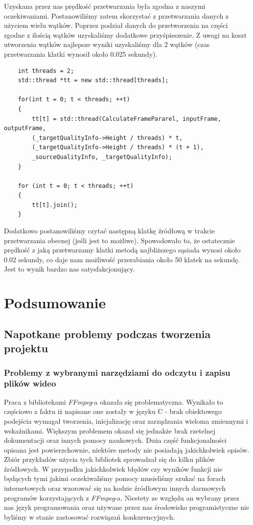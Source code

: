 \documentclass[twoside]{projektInzynierskiMS}
\begin{document}
Uzyskana przez nas prędkość przetwarzania była zgodna z naszymi oczekiwaniami. Postanowiliśmy zatem skorzystać z przetwarzania danych z użyciem wielu wątków. Poprzez podział danych do przetworzenia na części zgodne z ilością wątków uzyskaliśmy dodatkowe przyśpieszenie. Z uwagi na koszt utworzenia wątków najlepsze wyniki uzyskaliśmy dla 2 wątków (czas przetwarzania klatki wynosił około 0.025 sekundy). 

\begin{verbatim}
    int threads = 2;
    std::thread *tt = new std::thread[threads];

    for(int t = 0; t < threads; ++t)
    {
        tt[t] = std::thread(CalculateFramePararel, inputFrame, outputFrame,
        (_targetQualityInfo->Height / threads) * t, 
        (_targetQualityInfo->Height / threads) * (t + 1),
        _sourceQualityInfo, _targetQualityInfo);
    }

    for (int t = 0; t < threads; ++t)
    {
        tt[t].join();
    }
\end{verbatim}

Dodatkowo postanowiliśmy czytać następną klatkę źródłową w trakcie przetwarzania obecnej (jeśli jest to możliwe). Spowodowało to, że ostatecznie prędkość z jaką przetwarzamy klatki metodą najbliższego sąsiada wynosi około 0.02 sekundy, co daje nam możliwość przerabiania około 50 klatek na sekundę. Jest to wynik bardzo nas satysfakcjonujący.

\section{Podsumowanie}
\subsection{Napotkane problemy podczas tworzenia projektu}
\subsubsection{Problemy z wybranymi narzędziami do odczytu i zapisu plików wideo}
Praca z bibliotekami \emph{FFmpeg}-a okazała się problematyczna. Wynikało to częściowo z faktu iż napisane one zostały w języku C - brak obiektowego podejścia wymagał tworzenia, inicjalizację oraz zarządzania wieloma zmiennymi i wskaźnikami. Większym problemem okazał się jednakże brak rzetelnej dokumentacji oraz innych pomocy naukowych. Duża część funkcjonalności opisana jest powierzchownie, niektóre metody nie posiadają jakichkolwiek opisów. Zbiór przykładów użycia tych bibliotek sprowadzał się do kilku plików źródłowych. W przypadku jakichkolwiek błędów czy wyników funkcji nie będących tymi jakimi oczekiwaliśmy pomocy musieliśmy szukać na forach internetowych oraz wzorować się na kodzie źródłowym innych darmowych programów korzystających z \emph{FFmpeg}-a. Niestety ze względu an wybrany przez nas język programowania oraz używane przez nas środowisko programistyczne nie byliśmy w stanie zastosować rozwiązań konkurencyjnych.
\end{document}
